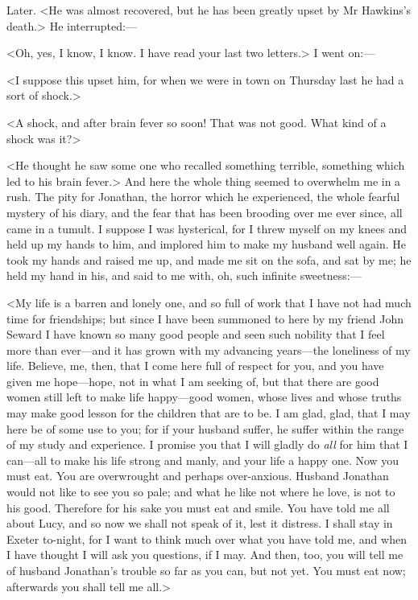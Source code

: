 \begin{diary}{Later.}
<He was almost recovered, but he has been greatly upset by Mr Hawkins's death.> He interrupted:—

<Oh, yes, I know, I know. I have read your last two letters.> I went on:—

<I suppose this upset him, for when we were in town on Thursday last he had a sort of shock.>

<A shock, and after brain fever so soon! That was not good. What kind of a shock was it?>

<He thought he saw some one who recalled something terrible, something which led to his brain fever.> And here the whole thing seemed to overwhelm me in a rush. The pity for Jonathan, the horror which he experienced, the whole fearful mystery of his diary, and the fear that has been brooding over me ever since, all came in a tumult. I suppose I was hysterical, for I threw myself on my knees and held up my hands to him, and implored him to make my husband well again. He took my hands and raised me up, and made me sit on the sofa, and sat by me; he held my hand in his, and said to me with, oh, such infinite sweetness:—

<My life is a barren and lonely one, and so full of work that I have not had much time for friendships; but since I have been summoned to here by my friend John Seward I have known so many good people and seen such nobility that I feel more than ever—and it has grown with my advancing years—the loneliness of my life. Believe, me, then, that I come here full of respect for you, and you have given me hope—hope, not in what I am seeking of, but that there are good women still left to make life happy—good women, whose lives and whose truths may make good lesson for the children that are to be. I am glad, glad, that I may here be of some use to you; for if your husband suffer, he suffer within the range of my study and experience. I promise you that I will gladly do \textit{all} for him that I can—all to make his life strong and manly, and your life a happy one. Now you must eat. You are overwrought and perhaps over-anxious. Husband Jonathan would not like to see you so pale; and what he like not where he love, is not to his good. Therefore for his sake you must eat and smile. You have told me all about Lucy, and so now we shall not speak of it, lest it distress. I shall stay in Exeter to-night, for I want to think much over what you have told me, and when I have thought I will ask you questions, if I may. And then, too, you will tell me of husband Jonathan's trouble so far as you can, but not yet. You must eat now; afterwards you shall tell me all.>


\end{diary}
